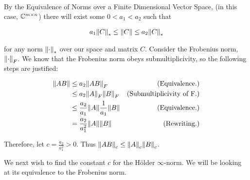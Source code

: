 \partbreak
\begin{solution}

    By the Equivalence of Norms over a Finite Dimensional Vector Space, (in this case, $\mathbb{C}^{m\times n}$) there will exist some $0< a_1 < a_2$ such that 

\begin{align}
     a_1\norm{C}_* \leq \norm{C} \leq a_2\norm{C}_* \label{p3a: equiv}
\end{align}

for any norm $\norm{\cdot}_*$ over our space and matrix $C$. Consider the Frobenius norm, $\norm{\cdot}_F$. We know that the Frobenius norm obeys submultiplicivity, so the following steps are justified:

\alignbreak
\begin{align}
    \norm{AB} &\leq a_2\norm{AB}_F   &\text{(Equivalence.)}\nonumber\\
    &\leq a_2\norm{A}_F\norm{B}_F    &\text{(Submultiplicivity of F.)}\nonumber\\
    &\leq \frac{a_2}{a_1}\norm{A}\frac{1}{a_1}\norm{B}  &\text{(Equivalence.)}\nonumber\\
    &= \frac{a_2}{a_1^2}\norm{A}\norm{B}    &\text{(Rewriting.)}\nonumber
\end{align}
\alignbreak

Therefore, let $c = \frac{a_2}{a_1^2} > 0$. Thus $\norm{AB}_c \leq \norm{A}_c\norm{B}_c$.


We next wish to find the constant $c$ for the H\"{o}lder $\infty$-norm. We will be looking at its equivalence to the Frobenius norm. 


\end{solution}
